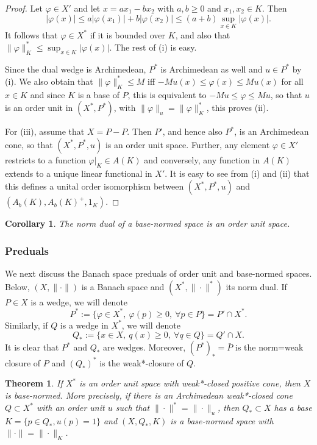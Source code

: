 \documentclass[12pt]{article}
\newtheorem{thm}{Theorem}
\newtheorem{coro}{Corollary}
\theoremstyle{remark}
\newcommand{\<}{\langle}
\begin{document}
\begin{proof} Let $\varphi\in X'$ and let $x=ax_1-bx_2$ with $a,b\ge 0$ and $x_1,x_2\in K$. Then
\[
|\varphi(x)|\le a|\varphi(x_1)|+b|\varphi(x_2)|\le (a+b)\sup_{x\in K}|\varphi(x)|.
\]
It follows that $\varphi\in X^*$ if it is bounded over $K$, and also that $\|\varphi\|_K^*\le\sup_{x\in K}|\varphi(x)|$. The rest of (i) is easy.

 Since the dual wedge is Archimedean, $P^*$ is Archimedean as well and $u\in P^*$ by (i). 
We also obtain that $\|\varphi\|_K^*\le M$ iff $-Mu(x)\le  \varphi(x)\le Mu(x)$ for all $x\in K$  and since $K$ is a base of $P$, this is equivalent to  
 $-Mu\le \varphi\le Mu$, so that $u$ is an order unit in $(X^*,P^*)$, with $\|\varphi\|_u= \|\varphi\|_K^*$, this proves (ii).

For (iii), assume that $X=P-P$. Then $P'$, and hence also $P^*$, is an Archimedean cone, so that $(X^*,P^*,u)$ is an order unit space.
Further, any element $\varphi\in X'$ restricts to a function $\varphi|_K\in A(K)$ and conversely, any 
function in $A(K)$ extends to a unique linear functional in $X'$. It is easy to see  from (i) and (ii) that this defines a unital order isomorphism between $(X^*,P^*,u)$ and 
$(A_b(K),A_b(K)^+,1_K)$.

\end{proof}

\begin{coro} The norm dual of a base-normed space is an order unit space.

\end{coro}




\subsubsection*{Preduals}

We next discuss the Banach space preduals of order unit and base-normed spaces. Below,  $(X,\|\cdot\|)$ is a Banach space and
$(X^*,\|\cdot\|^*)$ its norm dual.  If $P\in X$ is a wedge, we will denote 
\[
P^*:=\{\varphi\in X^*,\ \varphi(p)\ge 0,\ \forall p\in P\}= P'\cap X^*.
\]
Similarly, if $Q$ is a wedge in $X^*$, we will denote 
\[
Q_*:=\{x\in X,\ q(x)\ge 0,\ \forall q\in Q\}= Q'\cap X.
\]
It is clear that $P^*$ and $Q_*$ are wedges. Moreover, $(P^*)_*=\bar P$ is the norm=weak closure of $P$  and $(Q_*)^*$ is the weak*-closure of $Q$. 

\begin{thm}\cite{ellis, asell} If $X^*$ is an order unit space with weak*-closed positive cone, then $X$ is base-normed. More precisely, 
if there is an Archimedean weak*-closed cone $Q\subset X^*$ with an order unit $u$  such that $\|\cdot\|^*=\|\cdot\|_u$, 
 then  $Q_*\subset X$ has a base $K=\{p\in Q_*, u(p)=1\}$ and $(X,Q_*,K)$ is a base-normed 
space with $\|\cdot\|=\|\cdot\|_K$.

\end{thm}
\end{document}
